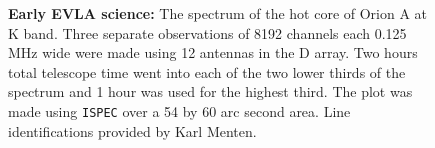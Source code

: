 \bre
{}
\ere

\vfill\eject

\begin{figure}[!ht]
\centering
\caption[Orion hot core at K band]{{\bf Early EVLA science:} The
spectrum of the hot core of Orion A at K band.  Three separate
observations of 8192 channels each 0.125 MHz wide were made using 12
antennas in the D array.  Two hours total telescope time went into
each of the two lower thirds of the spectrum and 1 hour was used for
the highest third.  The plot was made using {\tt ISPEC} over a 54 by
60 arc second area.  Line identifications provided by Karl
Menten.}
\label{fig:OrionKband}
\end{figure}



